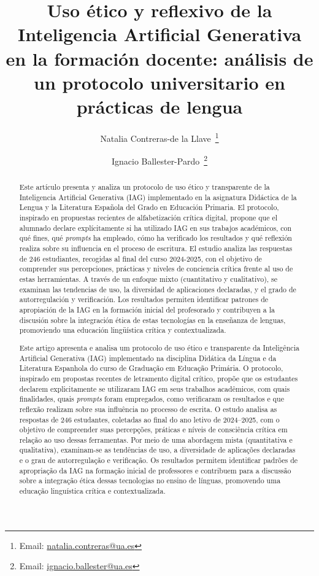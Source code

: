 \documentclass[spanish]{textolivre}
\title{Uso ético y reflexivo de la Inteligencia Artificial Generativa en la formación docente: análisis de un protocolo universitario en prácticas de lengua}
\author[1]{Natalia Contreras-de la Llave~\orcid{0000-0002-8467-8024}\thanks{Email: \href{mailto:natalia.contreras@ua.es}{natalia.contreras@ua.es}}}
\author[1]{Ignacio Ballester-Pardo~\orcid{0000-0002-5826-3167}\thanks{Email: \href{mailto:ignacio.ballester@ua.es}{ignacio.ballester@ua.es}}}
\affil[1]{Universidad de Alicante, Facultad de Educación, Departamento de Innovación y Formación Didáctica, Alicante, España.}
\begin{document}
\maketitle

\begin{polyabstract}
\begin{abstract}
Este artículo presenta y analiza un protocolo de uso ético y transparente de la Inteligencia Artificial Generativa (IAG) implementado en la asignatura Didáctica de la Lengua y la Literatura Española del Grado en Educación Primaria. El protocolo, inspirado en propuestas recientes de alfabetización crítica digital, propone que el alumnado declare explícitamente si ha utilizado IAG en sus trabajos académicos, con qué fines, qué \textit{prompts} ha empleado, cómo ha verificado los resultados y qué reflexión realiza sobre su influencia en el proceso de escritura. El estudio analiza las respuestas de 246 estudiantes, recogidas al final del curso 2024-2025, con el objetivo de comprender sus percepciones, prácticas y niveles de conciencia crítica frente al uso de estas herramientas. A través de un enfoque mixto (cuantitativo y cualitativo), se examinan las tendencias de uso, la diversidad de aplicaciones declaradas, y el grado de autorregulación y verificación. Los resultados permiten identificar patrones de apropiación de la IAG en la formación inicial del profesorado y contribuyen a la discusión sobre la integración ética de estas tecnologías en la enseñanza de lenguas, promoviendo una educación lingüística crítica y contextualizada.

\end{abstract}

\begin{portuguese}
\begin{abstract}
Este artigo apresenta e analisa um protocolo de uso ético e transparente da Inteligência Artificial Generativa (IAG) implementado na disciplina Didática da Língua e da Literatura Espanhola do curso de Graduação em Educação Primária. O protocolo, inspirado em propostas recentes de letramento digital crítico, propõe que os estudantes declarem explicitamente se utilizaram IAG em seus trabalhos acadêmicos, com quais finalidades, quais \textit{prompts} foram empregados, como verificaram os resultados e que reflexão realizam sobre sua influência no processo de escrita. O estudo analisa as respostas de 246 estudantes, coletadas ao final do ano letivo de 2024–2025, com o objetivo de compreender suas percepções, práticas e níveis de consciência crítica em relação ao uso dessas ferramentas. Por meio de uma abordagem mista (quantitativa e qualitativa), examinam-se as tendências de uso, a diversidade de aplicações declaradas e o grau de autorregulação e verificação. Os resultados permitem identificar padrões de apropriação da IAG na formação inicial de professores e contribuem para a discussão sobre a integração ética dessas tecnologias no ensino de línguas, promovendo uma educação linguística crítica e contextualizada.


\end{abstract}
\end{portuguese}
\end{polyabstract}
\end{document}
